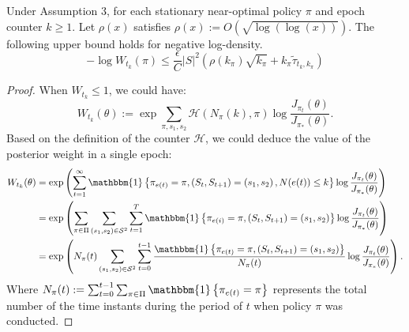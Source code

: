 \begin{lemma}
\label{lemma3replacement}
Under Assumption 3, for each stationary near-optimal policy $\pi$ and epoch counter $k \geq 1$. Let $\rho(x)$ satisfies $\rho(x) := O(\sqrt{\log (\log(x))})$. The following upper bound holds for negative log-density.
$$
-\log W_{t_{k}}(\pi) \leq \frac{\epsilon}{C}|S|^{2}(  \rho(k_{\pi}) \sqrt{k_{\pi}} + k_{\pi} \tilde{\tau}_{t_{k},k_{\pi}})
$$
\begin{proof}
When $W_{t_{k}} \leq 1$, we could have:
\begin{equation}
W_{t_{k}}(\theta):=\exp \sum_{\pi, s_{1}, s_{2}} \mathcal{H}\left(N_{\pi}(k), \pi\right) \log \frac{J_{\pi_{t}}(\theta)}{J_{\pi_{*}}(\theta)}.
\end{equation}
Based on the definition of the counter $\mathcal{H}$, we could deduce the value of the posterior weight in a single epoch:
\begin{equation}
\begin{aligned}
W_{t_{k}}(\theta)&= \exp \left(\sum_{t=1}^{\infty} \mathbbm{1}\left\{\pi_{e(t)}=\pi,\left(S_{t}, S_{t+1}\right)=\left(s_{1}, s_{2}\right), N(e(t)) \leq k\right\}\log \frac{J_{\pi_{t}}(\theta)}{J_{\pi_{*}}(\theta)}\right)\\
& = \exp \left(\sum_{\pi \in \Pi} \sum_{\left(s_{1}, s_{2}\right) \in \mathcal{S}^{2}} \sum_{t=1}^{T} \mathbbm{1}\left\{\pi_{e(i)}=\pi,\left(S_{t}, S_{t+1}\right)=\left(s_{1}, s_{2}\right)\right\}\log \frac{J_{\pi_{t}}(\theta)}{J_{\pi_{*}}(\theta)}\right)\\
& = \exp \left(N_{\pi}(t) \sum_{\left(s_{1}, s_{2}\right) \in \mathcal{S}^{2}} \sum_{t=0}^{t-1} \frac{\mathbbm{1}\left\{\pi_{e(t)}=\pi,\left(S_{t}, S_{t+1}\right)=\left(s_{1}, s_{2}\right)\right\}}{N_{\pi}(t)}\log \frac{J_{\pi_{t}}(\theta)}{J_{\pi_{*}}(\theta)}\right).
\end{aligned}
\end{equation}
Where $N_{\pi}(t):=\sum_{t=0}^{t-1}\sum_{\pi \in \Pi} \mathbbm{1}\left\{\pi_{e(t)}=\pi\right\}$ represents the total number of the time instants during the period of $t$ when policy $\pi$ was conducted.


\end{proof}
\end{lemma}
